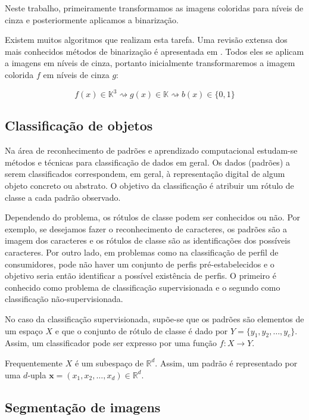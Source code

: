 \documentclass[a4paper,11pt]{article}
\begin{document}
Neste trabalho, primeiramente transformamos as imagens coloridas para níveis de cinza e posteriormente aplicamos a binarização.

Existem muitos algoritmos que realizam esta tarefa. Uma revisão extensa dos mais conhecidos métodos de binarização é apresentada em \cite{citeulike:890354}. Todos eles se aplicam a imagens em níveis de cinza, portanto inicialmente transformaremos a imagem colorida $f$ em níveis de cinza $g$:

\begin{equation}
  f(x) \in \mathbb{K}^3 \rightsquigarrow g(x) \in \mathbb{K} \rightsquigarrow b(x) \in \{0, 1\}
\end{equation}

\subsection{Classificação de objetos}

Na área de reconhecimento de padrões e aprendizado computacional
estudam-se métodos e técnicas para classificação de dados em geral. Os
dados (padrões) a serem classificados correspondem, em geral, à
representação digital de algum objeto concreto ou abstrato. O objetivo
da classificação é atribuir um rótulo de classe a cada padrão
observado.

Dependendo do problema, os rótulos de classe podem ser conhecidos ou
não. Por exemplo, se desejamos fazer o reconhecimento de caracteres,
os padrões são a imagem dos caracteres e os rótulos de classe são as
identificações dos possíveis caracteres. Por outro lado, em problemas
como na classificação de perfil de consumidores, pode não haver um
conjunto de perfis pré-estabelecidos e o objetivo seria então
identificar a possível existência de perfis. O primeiro é conhecido
como problema de classificação supervisionada e o segundo como
classificação não-supervisionada.

No caso da classificação supervisionada, supõe-se que os padrões são
elementos de um espaço $X$ e que o conjunto de rótulo de classe é dado
por $Y=\{y_1,y_2,\ldots,y_c\}$. Assim, um classificador pode ser
expresso por uma função $f: X \to Y$.

Frequentemente $X$ é um subespaço de $\mathbb{R}^d$. Assim, um padrão
é representado por uma $d$-upla $\mathbf{x}=(x_1,x_2,\ldots,x_d) \in
\mathbb{R}^d$.

\subsection{Segmentação de imagens}
\end{document}
